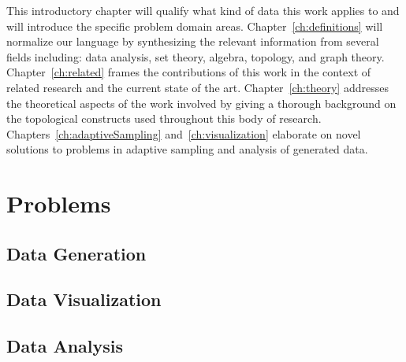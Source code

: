 This introductory chapter will qualify what kind of data this work applies to and will introduce the specific problem domain areas.
%
Chapter~\ref{ch:definitions} will normalize our language by synthesizing the relevant information from several fields including: data analysis, set theory, algebra, topology, and graph theory.
%
Chapter~\ref{ch:related} frames the contributions of this work in the context of related research and the current state of the art.
%
Chapter~\ref{ch:theory} addresses the theoretical aspects of the work involved by giving a thorough background on the topological constructs used throughout this body of research.
%
Chapters~\ref{ch:adaptiveSampling} and~\ref{ch:visualization} elaborate on novel solutions to problems in adaptive sampling and analysis of generated data.

\section{Problems}
\subsection{Data Generation}
\subsection{Data Visualization}
\subsection{Data Analysis}
